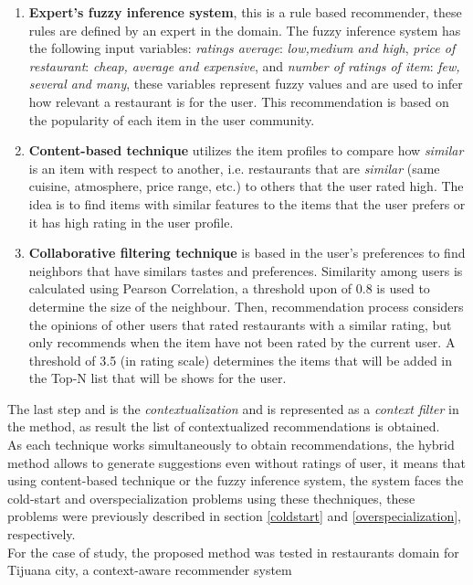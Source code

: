 \begin{enumerate} 
\item \textbf{Expert's fuzzy inference system}, 
this is a rule based recommender, these rules are defined by 
an expert in the domain. The
fuzzy inference system has the following input variables:
\textit{ratings average}:  \textit{low,medium and high}, \textit{price
of restaurant}:  \textit{cheap, average and expensive}, and
\textit{number of ratings of item}:  \textit{few, several and many},
these variables represent fuzzy values and are used to infer how
relevant a restaurant is for the  user. This recommendation is based
on the popularity of each  item in the user community. 
\item \textbf{Content-based technique} 
utilizes the item profiles  to compare how
\textit{similar} is an item with respect to  another, i.e. restaurants
that are \textit{similar} (same cuisine,  atmosphere, price range,
etc.) to others that the user rated high.  The idea is to find items
with similar features to the items that the  user prefers or it has
high rating in the user profile. 
\item \textbf{Collaborative filtering technique} 
is based in the user's preferences  to find neighbors that
have similars tastes and preferences. Similarity among users is
calculated using Pearson Correlation, a threshold upon of 0.8 is used
to determine the size of the neighbour. Then, recommendation process
considers the opinions of other users that rated restaurants with a
similar rating, but only recommends when the item have not been rated
by the current user. A threshold of 3.5 (in rating scale) determines
the items that will be added in the Top-N list that will be shows for
the user. 
\end{enumerate}  
The last step and is the \textit{contextualization} and is
represented as a \textit{context filter} in the method, as result the
list of contextualized recommendations is obtained. \\ As each
technique works simultaneously to obtain recommendations, the hybrid
method allows to generate suggestions even without  ratings of user,
it means that using content-based technique or the fuzzy inference system, 
the system faces the cold-start and overspecialization
problems using these thechniques, these problems were previously
described in section \ref{coldstart} and \ref{overspecialization},
respectively.\\ 
For the case of study, the proposed method was tested in restaurants
domain for Tijuana city, a context-aware recommender system 
